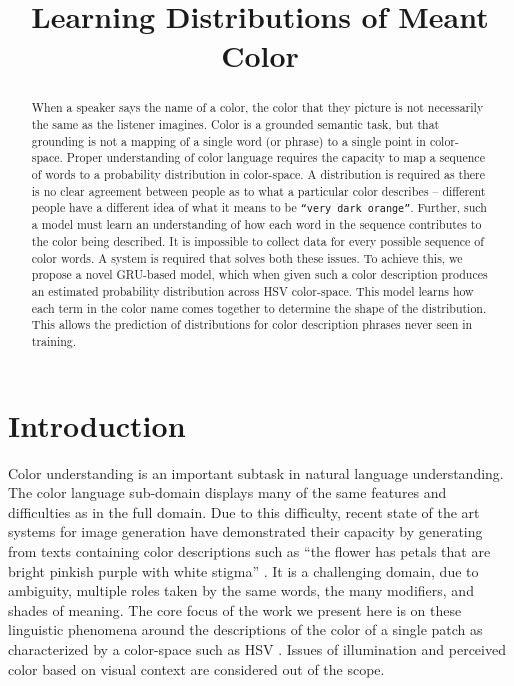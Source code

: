 \documentclass[11pt,a4paper]{article}
\title{Learning Distributions of Meant Color}
\newcommand{\parencite}{\citep}
\begin{document}
\maketitle

\begin{abstract}
When a speaker says the name of a color, the color that they picture is not necessarily the same as the listener imagines.
Color is a grounded semantic task, but that grounding is not a mapping of a single word (or phrase) to a single point in color-space.
Proper understanding of color language requires the capacity to map a sequence of words to a probability distribution in color-space.
A distribution is required as there is no clear agreement between people as to what a particular color describes -- different people have a different idea of what it means to be \texttt{``very dark orange''}.
Further, such a model must learn an understanding of how each word in the sequence contributes to the color being described.
It is impossible to collect data for every possible sequence of color words.
A system is required that solves both these issues.
To achieve this, we propose a novel GRU-based model, which when given such a color description produces an estimated probability distribution across HSV color-space.
This model learns how each term in the color name comes together to determine the shape of the distribution.
This allows the prediction of distributions for color description phrases never seen in training.
\end{abstract}

\section{Introduction}\label{sec:intro}

Color understanding is an important subtask in natural language understanding.
The color language sub-domain displays many of the same features and difficulties as in the full domain.
Due to this difficulty, recent state of the art systems for image generation have demonstrated their capacity by generating from texts containing color descriptions such as ``the flower has petals that are bright pinkish purple with white stigma'' \parencite{reed2016generative, 2015arXiv151102793M}.
It is a challenging domain, due to ambiguity, multiple roles taken by the same words, the many modifiers, and shades of meaning.
The core focus of the work we present here is on these linguistic phenomena around the descriptions of the color of a single patch as characterized by a color-space such as HSV \parencite{smith1978color}.
Issues of illumination and perceived color based on visual context are considered out of the scope.
\end{document}
